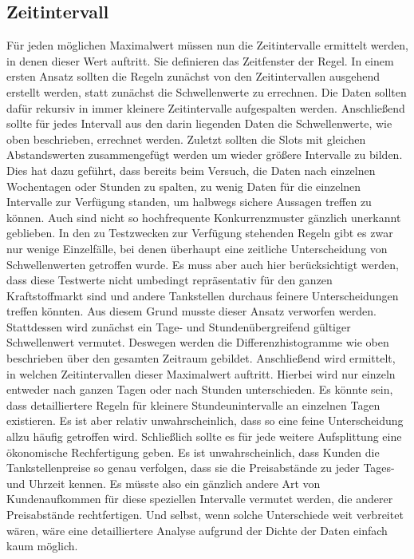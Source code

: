 \subsection{Zeitintervall}
Für jeden möglichen Maximalwert müssen nun die Zeitintervalle ermittelt werden, in denen dieser Wert auftritt. Sie definieren das Zeitfenster der Regel. In einem ersten Ansatz sollten die Regeln zunächst von den Zeitintervallen ausgehend erstellt werden, statt zunächst die Schwellenwerte zu errechnen. Die Daten sollten dafür rekursiv in immer kleinere Zeitintervalle aufgespalten werden. Anschließend sollte für jedes Intervall aus den darin liegenden Daten die Schwellenwerte, wie oben beschrieben, errechnet werden. Zuletzt sollten die Slots mit gleichen Abstandswerten zusammengefügt werden um wieder größere Intervalle zu bilden. Dies hat dazu geführt, dass bereits beim Versuch, die Daten nach einzelnen Wochentagen oder Stunden zu spalten, zu wenig Daten für die einzelnen Intervalle zur Verfügung standen, um halbwegs sichere Aussagen treffen zu können. Auch sind nicht so hochfrequente Konkurrenzmuster gänzlich unerkannt geblieben. In den zu Testzwecken zur Verfügung stehenden Regeln gibt es zwar nur wenige Einzelfälle, bei denen überhaupt eine zeitliche Unterscheidung von Schwellenwerten getroffen wurde. Es muss aber auch hier berücksichtigt werden, dass diese Testwerte nicht umbedingt repräsentativ für den ganzen Kraftstoffmarkt sind und andere Tankstellen durchaus feinere Unterscheidungen treffen könnten. Aus diesem Grund musste dieser Ansatz verworfen werden.\\
Stattdessen wird zunächst ein Tage- und Stundenübergreifend gültiger Schwellenwert vermutet. Deswegen werden die Differenzhistogramme wie oben beschrieben über den gesamten Zeitraum gebildet. Anschließend wird ermittelt, in welchen Zeitintervallen dieser Maximalwert auftritt. Hierbei wird nur einzeln entweder nach ganzen Tagen oder nach Stunden unterschieden. Es könnte sein, dass detailliertere Regeln für kleinere Stundeunintervalle an einzelnen Tagen existieren. Es ist aber relativ unwahrscheinlich, dass so eine feine Unterscheidung allzu häufig getroffen wird. Schließlich sollte es für jede weitere Aufsplittung eine ökonomische Rechfertigung geben. Es ist unwahrscheinlich, dass Kunden die Tankstellenpreise so genau verfolgen, dass sie die Preisabstände zu jeder Tages- und Uhrzeit kennen. Es müsste also ein gänzlich andere Art von Kundenaufkommen für diese speziellen Intervalle vermutet werden, die anderer Preisabstände rechtfertigen. Und selbst, wenn solche Unterschiede weit verbreitet wären, wäre eine detailliertere Analyse aufgrund der Dichte der Daten einfach kaum möglich.

